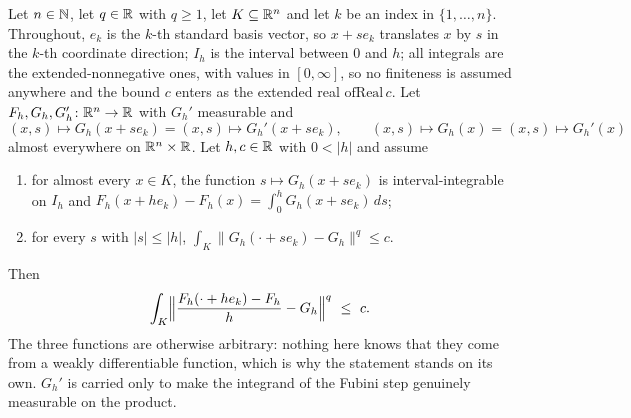 \begin{helper}
Let $n\in\mathbb{N}$, let $q\in\mathbb{R}$ with $q\ge1$, let $K\subseteq\mathbb{R}^n$ and let $k$ be an
index in $\{1,\dots,n\}$.  Throughout, $e_k$ is the $k$-th standard basis
vector, so $x+se_k$ translates $x$ by $s$ in the $k$-th coordinate direction;
$I_h$ is the interval between $0$ and $h$; all integrals are the
extended-nonnegative ones, with values in $[0,\infty]$, so no finiteness is
assumed anywhere and the bound $c$ enters as the extended real
$\mathrm{ofReal}\,c$.  Let $F_h,G_h,G_h'\colon\mathbb{R}^n\to\mathbb{R}$ with $G_h'$ measurable
and
\[
(x,s)\mapsto G_h(x+se_k)=(x,s)\mapsto G_h'(x+se_k),
\qquad
(x,s)\mapsto G_h(x)=(x,s)\mapsto G_h'(x)
\]
almost everywhere on $\mathbb{R}^n\times\mathbb{R}$.  Let $h,c\in\mathbb{R}$ with $0<|h|$ and assume
\begin{enumerate}
\item[(H1)] for almost every $x\in K$, the function $s\mapsto G_h(x+se_k)$ is
  interval-integrable on $I_h$ and
  $F_h(x+he_k)-F_h(x)=\int_0^hG_h(x+se_k)\,ds$;
\item[(H2)] for every $s$ with $|s|\le|h|$,
  $\int_K\|G_h(\cdot+se_k)-G_h\|^{q}\le c$.
\end{enumerate}
Then
\[
\int_K\Bigl\|\frac{F_h(\cdot+he_k)-F_h}{h}-G_h\Bigr\|^{q}\ \le\ c .
\]
The three functions are otherwise arbitrary: nothing here knows that they come
from a weakly differentiable function, which is why the statement stands on its
own.  $G_h'$ is carried only to make the integrand of the Fubini step genuinely
measurable on the product.
\end{helper}
